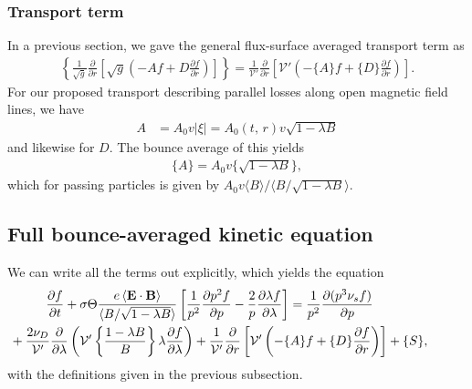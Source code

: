 \documentclass[11pt,a4paper]{article}
\renewcommand{\b}[1]{\ensuremath{ {\bf #1 } }}
\begin{document}
\subsubsection*{Transport term}
In a previous section, we gave the general flux-surface averaged transport term as
\begin{align}
\left\{\frac{1}{\sqrt{g}}\frac{\partial}{\partial r}\left[ \sqrt{g}\left( -Af+D\frac{\partial f}{\partial r}\right)\right]\right\} = \frac{1}{\mathcal{V}'}\frac{\partial}{\partial r}\left[ \mathcal{V'}\left(-\{A\}f+ \{D\}\frac{\partial f}{\partial r} \right) \right].
\end{align}
For our proposed transport describing parallel losses along open magnetic field lines, we have
\begin{align}
A &= A_0 v |\xi| = A_0(t,\,r) v \sqrt{1-\lambda B}
\end{align}
and likewise for $D$. The bounce average of this yields
\begin{align}
\{A\} = A_0 v \{\sqrt{1-\lambda B}\},
\end{align}
which for passing particles is given by  $A_0 v \langle B \rangle/\langle B/\sqrt{1-\lambda B}\rangle$.


\subsection{Full bounce-averaged kinetic equation}
We can write all the terms out explicitly, which yields the equation
\begin{align}
\frac{\partial f}{\partial t} &+ \sigma \Theta \frac{e \left\langle \b{E}\cdot\b{B}\right\rangle}{\langle B/\sqrt{1-\lambda B} \rangle}\left[\frac{1}{p^2}\frac{\partial p^2 f}{\partial p}  - \frac{2}{p}\frac{\partial \lambda f}{\partial \lambda}\right]  = \frac{1}{p^2}\frac{\partial(p^3 \nu_s f)}{\partial p} \nonumber \\
&\hspace{-15mm}+ \frac{2\nu_D}{\mathcal{V}'}\frac{\partial}{\partial \lambda}\left(  \mathcal{V'}\left\{\frac{1-\lambda B}{B}\right\} \lambda\frac{\partial f}{\partial \lambda}\right)+\frac{1}{\mathcal{V}'}\frac{\partial}{\partial r}\left[ \mathcal{V'}\left(-\{A\}f+ \{D\}\frac{\partial f}{\partial r} \right) \right] + \{S\},
\label{eq:full bounce averaged}
\end{align}
with the definitions given in the previous subsection.
\end{document}
